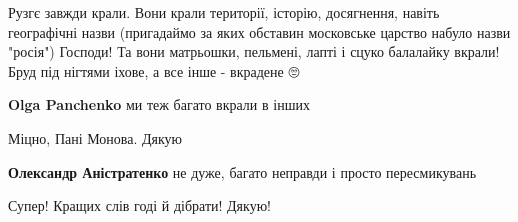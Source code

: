 \begin{itemize}
 

Рузгє завжди крали. Вони крали території, історію, досягнення, навіть
географічні назви (пригадаймо за яких обставин московське царство набуло назви
"росія") Господи! Та вони матрьошки, пельмені, лапті і сцуко балалайку вкрали!
Бруд під нігтями іхове, а все інше - вкрадене 🙄

\begin{itemize}
 
\textbf{Olga Panchenko} ми теж багато вкрали в інших
\end{itemize}

 
Міцно, Пані Монова. Дякую

\begin{itemize}
 
\textbf{Олександр Аністратенко} не дуже, багато неправди і просто пересмикувань
\end{itemize}

 
Супер! Кращих слів годі й дібрати! Дякую!

\begin{itemize}
 

\end{itemize}
\end{itemize}
